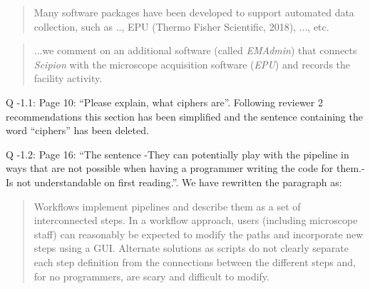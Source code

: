 \documentclass[a4paper,12pt]{article}
\def\scipion{\textit{Scipion}\xspace}
\def\emadmin{\textit{EMAdmin}\xspace}
\def\epu{\textit{EPU}\xspace}
\begin{document}
\begin{reviewer}
\begin{quote}
 Many software packages have been developed to support automated data collection, such as 
 .., EPU (Thermo Fisher Scientific, 2018), ..., etc.
\end{quote}

\begin{quote}
...we comment on an additional software (called  \emadmin) that connects \scipion with the microscope acquisition software (\epu) and records the facility activity.
\end{quote}

Q \the\numexpr\value{pointcounter}-1\relax.1: Page 10: ``Please explain, what ciphers are''. Following reviewer 2 recommendations this section has been simplified and the sentence containing the word ``ciphers'' has been deleted. 

Q \the\numexpr\value{pointcounter}-1\relax.2: Page 16: ``The sentence -They can potentially play with the pipeline in ways that are not possible when having a programmer writing the code for them.- Is not understandable on first reading.''. We have rewritten the paragraph as:


\begin{quote}
 Workflows implement pipelines and describe them as a set of interconnected steps. In a workflow approach, users (including microscope staff) can reasonably be expected to modify the paths and incorporate new steps using a GUI. Alternate solutions as scripts do not clearly separate each step definition from the connections between the different steps and, for no programmers, are scary and difficult to modify. 
\end{quote}

\end{reviewer}
\end{document}
